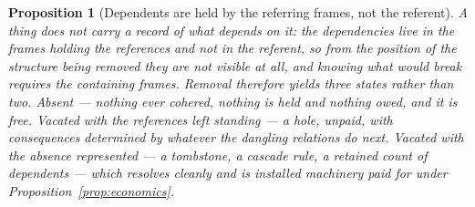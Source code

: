 \documentclass[11pt,a4paper]{article}
\newtheorem{proposition}[definition]{Proposition}
\theoremstyle{remark}\newtheorem{remark}[definition]{Remark}
\begin{document}
\begin{proposition}[Dependents are held by the referring frames, not the referent]\label{prop:vacated-three-states}
A thing does not carry a record of what depends on it: the dependencies live in the frames holding the
references and not in the referent, so from the position of the structure being removed they are not
visible at all, and knowing what would break requires the containing frames. Removal therefore yields
three states rather than two. \emph{Absent} --- nothing ever cohered, nothing is held and nothing owed,
and it is free. \emph{Vacated with the references left standing} --- a hole, unpaid, with consequences
determined by whatever the dangling relations do next. \emph{Vacated with the absence represented} ---
a tombstone, a cascade rule, a retained count of dependents --- which resolves cleanly and is installed
machinery paid for under Proposition~\ref{prop:economics}.
\end{proposition}
\end{document}
